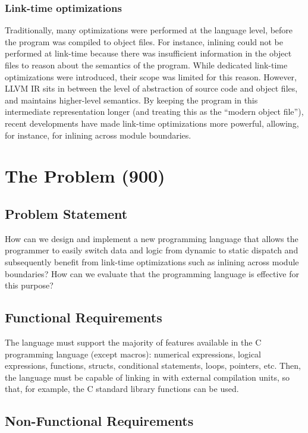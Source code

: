 \documentclass[12pt,a4paper,twoside]{report}
\begin{document}
\subsection{Link-time optimizations}

Traditionally, many optimizations were performed at the language level, before the program was compiled to object files. For instance, inlining could not be performed at link-time because there was insufficient information in the object files to reason about the semantics of the program. While dedicated link-time optimizations were introduced, their scope was limited for this reason. However, LLVM IR sits in between the level of abstraction of source code and object files, and maintains higher-level semantics. By keeping the program in this intermediate representation longer (and treating this as the ``modern object file''), recent developments have made link-time optimizations more powerful, allowing, for instance, for inlining across module boundaries.


\chapter{The Problem (900)}

\section{Problem Statement}

How can we design and implement a new programming language that allows the programmer to easily switch data and logic from dynamic to static dispatch and subsequently benefit from link-time optimizations such as inlining across module boundaries? How can we evaluate that the programming language is effective for this purpose?

\section{Functional Requirements}

The language must support the majority of features available in the C programming language (except macros): numerical expressions, logical expressions, functions, structs, conditional statements, loops, pointers, etc. Then, the language must be capable of linking in with external compilation units, so that, for example, the C standard library functions can be used.  

\section{Non-Functional Requirements}
\end{document}
